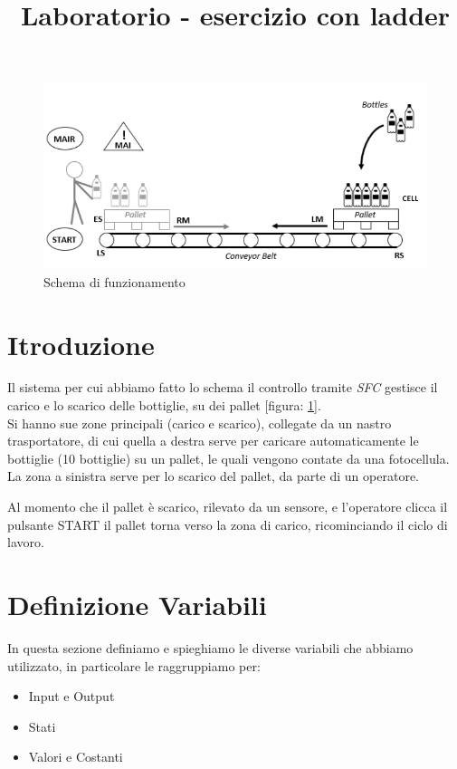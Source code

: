 \documentclass{article}
\title{Laboratorio - esercizio con ladder}
\date{}
\begin{document}
\tableofcontents

\begin{figure}[b]
    \centering
    \includegraphics[width = 0.8 \linewidth]{schematico.png}
    \caption{Schema di funzionamento}
    \label{fig:schematico}
\end{figure}
\section{Itroduzione}
Il sistema per cui abbiamo fatto lo schema il controllo tramite \textit{SFC} gestisce il carico e lo scarico delle bottiglie, su dei pallet [figura: \ref{fig:schematico}].
\\

Si hanno sue zone principali (carico e scarico), collegate da un nastro trasportatore, di cui quella a destra serve per caricare automaticamente le bottiglie (10 bottiglie) su un pallet, le quali vengono contate da una fotocellula. La zona a sinistra serve per lo scarico del pallet, da parte di un operatore.

Al momento che il pallet è scarico, rilevato da un sensore, e l'operatore clicca il pulsante START il pallet torna verso la zona di carico, ricominciando il ciclo di lavoro.

\section{Definizione Variabili}
In questa sezione definiamo e spieghiamo le diverse variabili che abbiamo utilizzato, in particolare le raggruppiamo per:
\begin{itemize}
    \item Input e Output
    \item Stati
    \item Valori e Costanti
\end{itemize}
\end{document}
